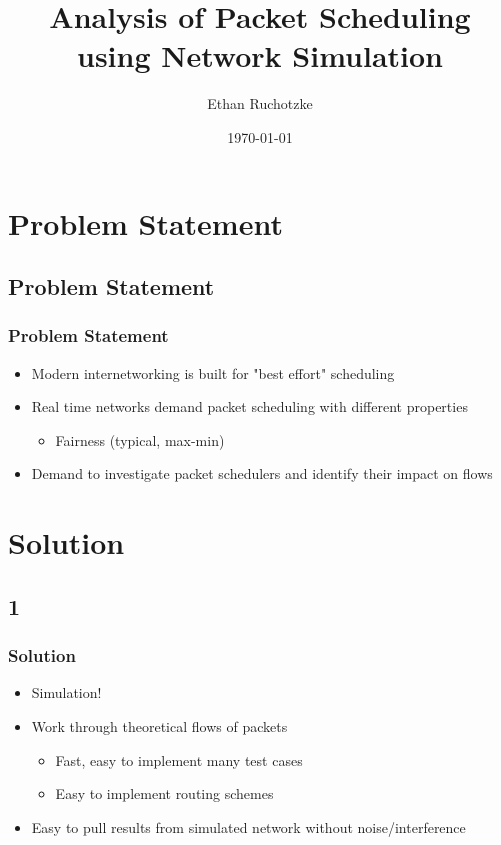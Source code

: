 \documentclass[compress]{beamer}
\title[558 Project: Packet Scheduling]{Analysis of Packet Scheduling using Network Simulation}
\author[Ethan Ruchotzke]{Ethan Ruchotzke}
\institute[]{CprE 558\\Iowa State University}
\date{\today}
\begin{document}
    \frame{\titlepage}


    \section{Problem Statement}

    \subsection{Problem Statement}
    \begin{frame}
        \frametitle{Problem Statement}
        \begin{itemize}
            \item Modern internetworking is built for "best effort" scheduling
            \item Real time networks demand packet scheduling with different properties
            \begin{itemize}
                \item Fairness (typical, max-min)
            \end{itemize}
            \item Demand to investigate packet schedulers and identify their impact on flows
        \end{itemize}
    \end{frame}


    \section{Solution}

    \subsection{1}
    \begin{frame}
        \frametitle{Solution}
        \begin{itemize}
            \item Simulation!
            \item Work through theoretical flows of packets
            \begin{itemize}
                \item Fast, easy to implement many test cases
                \item Easy to implement routing schemes
            \end{itemize}
            \item Easy to pull results from simulated network without noise/interference
        \end{itemize}
    \end{frame}
\end{document}
